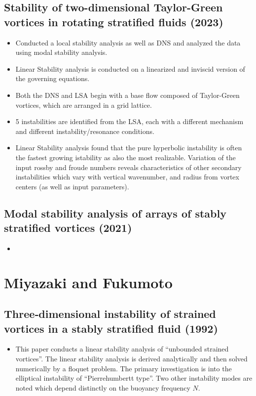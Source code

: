 \documentclass{article}
\begin{document}
\subsection{Stability of two-dimensional Taylor-Green vortices in rotating
stratified fluids (2023)}
\begin{itemize}
    \item Conducted a local stability analysis as well as DNS and analyzed the
    data using modal stability analysis. 
    \item Linear Stability analysis is conducted on a linearized and inviscid
    version of the governing equations.
    \item Both the DNS and LSA begin with a base flow composed of Taylor-Green
    vortices, which are arranged in a grid lattice. 
    \item 5 instabilities are identified from the LSA, each with a different
    mechanism and different instability/resonance conditions. 
    \item Linear Stability analysis found that the pure hyperbolic instability
    is often the fastest growing istability as also the most realizable.
    Variation of the input rossby and froude numbers reveals characteristics of
    other secondary instabilities which vary with vertical wavenumber, and
    radius from vortex centers (as well as input parameters). 
\end{itemize}

\subsection{Modal stability analysis of arrays of stably stratified vortices
(2021)}
\begin{itemize}
    \item 
\end{itemize}


\section{Miyazaki and Fukumoto}

\subsection{Three‐dimensional instability of strained vortices in a stably
stratified fluid (1992)}
\begin{itemize}
    \item This paper conducts a linear stability analysis of ``unbounded
    strained vortices''. The linear stability analysis is derived analytically
    and then solved numerically by a floquet problem. The primary investigation
    is into the elliptical instability of ``Pierrehumbertt type''. Two other
    instability modes are noted which depend distinctly on the buoyancy
    frequency $N$.
\end{itemize}
\end{document}
